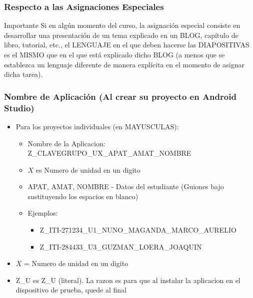 \begin{frame}
\frametitle{Respecto a las Asignaciones Especiales}

\begin{alertblock}{Importante}
Si en algún momento del curso, la asignación especial consiste en desarrollar una presentación de un tema explicado en un BLOG, capítulo de libro, tutorial, etc., el LENGUAJE en el que deben hacerse las DIAPOSITIVAS es el MISMO que en el que está explicado dicho BLOG (a menos que se establezca un lenguaje diferente de manera explícita en el momento de asignar dicha tarea).
\end{alertblock}



\end{frame}




\begin{frame}
\frametitle{Nombre de Aplicaci\'on (Al crear su proyecto en Android Studio)}
\begin{itemize}
\item Para los proyectos individuales (en MAYUSCULAS):
\begin{itemize}
\item Nombre de la Aplicacion: Z\_CLAVEGRUPO\_UX\_APAT\_AMAT\_NOMBRE
\item $X$ es Numero de unidad en un digito
\item APAT, AMAT, NOMBRE - Datos del estudiante (Guiones bajo sustituyendo los espacios en blanco)
\item Ejemplos:
\begin{itemize}
\item \tiny{Z\_ITI-271234\_U1\_NUNO\_MAGANDA\_MARCO\_AURELIO}
\item \tiny{Z\_ITI-284433\_U3\_GUZMAN\_LOERA\_JOAQUIN}
\end{itemize}

\end{itemize}
\item $X$ = Numero de unidad en un digito
\item Z\_U es Z\_U (literal). La razon es para que al instalar la aplicacion en el dispositivo de prueba, quede al final
\end{itemize}

\end{frame}

